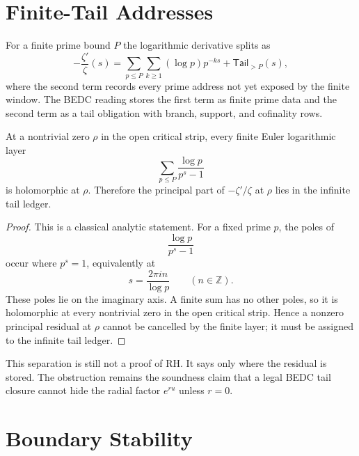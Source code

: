 \section{Finite-Tail Addresses}
\label{sec:rh-zeta-critical-unit-finite-tail-addresses}

\begin{definition}
\label{def:rh-zeta-critical-unit-finite-tail-address-ledger}
For a finite prime bound $P$ the logarithmic derivative splits as
$$
-\frac{\zeta'}{\zeta}(s)
=
\sum_{p\leq P}\sum_{k\geq 1}(\log p)p^{-ks}
+
\mathsf{Tail}_{>P}(s),
$$
where the second term records every prime address not yet exposed by the
finite window. The BEDC reading stores the first term as finite prime
data and the second term as a tail obligation with branch, support, and
cofinality rows.
\end{definition}

\begin{lemma}
\label{lem:rh-zeta-critical-unit-finite-layer-pole-separation}
At a nontrivial zero $\rho$ in the open critical strip, every finite
Euler logarithmic layer
$$
\sum_{p\leq P}\frac{\log p}{p^s-1}
$$
is holomorphic at $\rho$. Therefore the principal part of
$-\zeta'/\zeta$ at $\rho$ lies in the infinite tail ledger.
\end{lemma}

\begin{proof}
This is a classical analytic statement. For a fixed prime $p$, the poles
of
$$
\frac{\log p}{p^s-1}
$$
occur where $p^s=1$, equivalently at
$$
s=\frac{2\pi i n}{\log p}
\qquad (n\in\mathbb Z).
$$
These poles lie on the imaginary axis. A finite sum has no other poles,
so it is holomorphic at every nontrivial zero in the open critical strip.
Hence a nonzero principal residual at $\rho$ cannot be cancelled by the
finite layer; it must be assigned to the infinite tail ledger.
\end{proof}

This separation is still not a proof of RH. It says only where the
residual is stored. The obstruction remains the soundness claim that a
legal BEDC tail closure cannot hide the radial factor $e^{ru}$ unless
$r=0$.

\section{Boundary Stability}
\label{sec:rh-zeta-critical-unit-boundary-stability}


